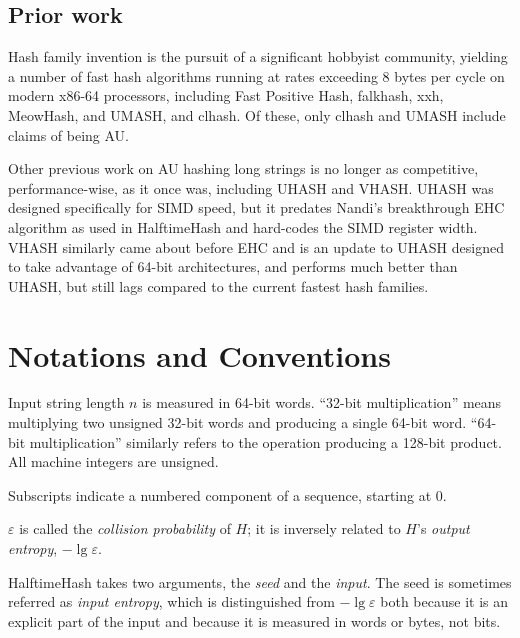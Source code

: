 \documentclass[runningheads]{llncs}
\begin{document}
\subsection{Prior work}

Hash family invention is the pursuit of a significant hobbyist community, yielding a number of fast hash algorithms running at rates exceeding 8 bytes per cycle on modern x86-64 processors, including Fast Positive Hash, falk\-hash, xxh, Meow\-Hash, and UMASH, and cl\-hash. \cite{smhasher}
Of these, only cl\-hash and U\-MASH include claims of being AU.

Other previous work on AU hashing long strings is no longer as competitive, performance-wise, as it once was, including UHASH and VHASH.
UHASH was designed specifically for SIMD speed, but it predates Nandi's breakthrough EHC algorithm as used in HalftimeHash and hard-codes the SIMD register width. \cite{umac,ehc-nandi}
VHASH similarly came about before EHC and is an update to UHASH designed to take advantage of 64-bit architectures, and performs much better than UHASH, but still lags compared to the current fastest hash families. \cite{vmac,smhasher}



\section{Notations and Conventions}

Input string length $n$ is measured in 64-bit words.
``32-bit multiplication'' means multiplying two unsigned 32-bit words and producing a single 64-bit word.
``64-bit multiplication'' similarly refers to the operation producing a 128-bit product.
All machine integers are unsigned.

Subscripts indicate a numbered component of a sequence, starting at 0.

$\varepsilon$ is called the {\em collision probability} of $H$; it is inversely related to $H$'s {\em output entropy}, $-\lg \varepsilon$.

HalftimeHash takes two arguments, the {\em seed} and the {\em input}.
The seed is sometimes referred as {\em input entropy}, which is distinguished from $-\lg \varepsilon$ both because it is an explicit part of the input and because it is measured in words or bytes, not bits.
\end{document}

